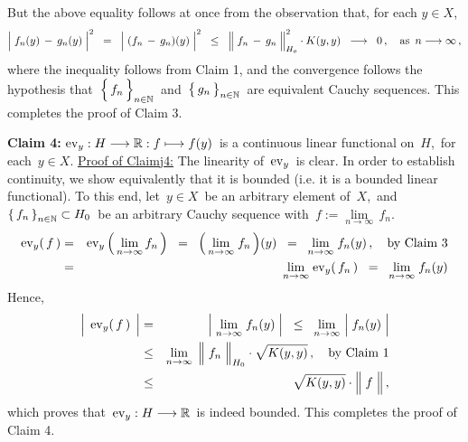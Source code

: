 But the above equality follows at once from the observation that,
for each $y \in X$,
\begin{eqnarray*}
\left\vert\; f_{n}(y) \,\overset{{\color{white}.}}{-}\, g_{n}(y) \;\right\vert^{2}
\;\; = \;\;
	\left\vert\; (f_{n} \,\overset{{\color{white}.}}{-}\, g_{n})(y) \;\right\vert^{2}
\;\; \leq \;\;
	\left\Vert\; f_{n} \,\overset{{\color{white}.}}{-}\, g_{n} \;\right\Vert_{H_{o}}^{2}
	\cdot
	K(y,y)
\;\; \longrightarrow \;\;
	0\,,
	\quad
	\textnormal{as \,$n \longrightarrow \infty$}\,,
\end{eqnarray*}
where the inequality follows from Claim 1, and the convergence follows
the hypothesis that
\,$\left\{\,\overset{{\color{white}.}}{f_{n}}\,\right\}_{n\in\N}$\,
and
\,$\left\{\,\overset{{\color{white}.}}{g_{n}}\,\right\}_{n\in\N}$\,
are equivalent Cauchy sequences.
This completes the proof of Claim 3.

\vskip 0.5cm
\noindent
\textbf{Claim 4:}\quad
$\textnormal{ev}_{y} : H \longrightarrow \mathbb{R} : f \longmapsto f(y)$\,
is a continuous linear functional on \,$H$,\, for each \,$y \in X$.
\vskip 0.2cm
\noindent
\underline{Proof of Claim{\color{white}j}4:}
\vskip0.2cm
\noindent
The linearity of \,$\textnormal{ev}_{y}$\, is clear.
In order to establish continuity, we show equivalently that it is bounded
(i.e. it is a bounded linear functional).
To this end, let 
\,$y \in X$\, be an arbitrary element of \,$X$,\, and
\,$\left\{\,f_{n}\,\right\}_{n\in\mathbb{N}} \subset H_{0}$\,
be an arbitrary Cauchy sequence with
\,$f := \underset{n\rightarrow\infty}{\lim}\,f_{n}$.\,
\begin{eqnarray*}
\textnormal{ev}_{y}(\,f\,)
& = &
	\textnormal{ev}_{y}\left(\,\underset{n\rightarrow\infty}{\lim}\,f_{n}\,\right)
\;\; = \;\;
	\left(\,\underset{n\rightarrow\infty}{\lim}\;f_{n}\,\right)\!(y)
\;\; = \;\;
	\underset{n\rightarrow\infty}{\lim}\;f_{n}(y)\,,
	\quad
	\textnormal{by Claim 3}
\\
& = &
	\underset{n\rightarrow\infty}{\lim}\;\textnormal{ev}_{y}(\,f_{n}\,)
\;\; = \;\;
	\underset{n\rightarrow\infty}{\lim}\;f_{n}(y)
\end{eqnarray*}
Hence,
\begin{eqnarray*}
\left\vert\;\, \overset{{\color{white}.}}{\ev_{y}(\,f\,)} \,\;\right\vert
& = &
	\left\vert\; \underset{n\rightarrow\infty}{\lim}\;f_{n}(y) \;\right\vert
\;\; \leq \;\;
	\underset{n\rightarrow\infty}{\lim}\, \left\vert\; \overset{{\color{white}.}}{f_{n}(y)} \;\right\vert
\\
& \leq &
	\underset{n\rightarrow\infty}{\lim}\;
	\left\Vert\; \overset{{\color{white}.}}{f_{n}} \;\right\Vert_{H_{0}}
	\cdot
	\sqrt{K(y,y)}\,,
	\quad
	\textnormal{by Claim 1}
\\
& \leq &
	\sqrt{K(y,y)} \cdot \left\Vert\; \overset{{\color{white}.}}{f} \;\right\Vert,
\end{eqnarray*}
which proves that \,$\textnormal{ev}_{y} : H \longrightarrow \mathbb{R}$\, is indeed bounded.
This completes the proof of Claim 4.

